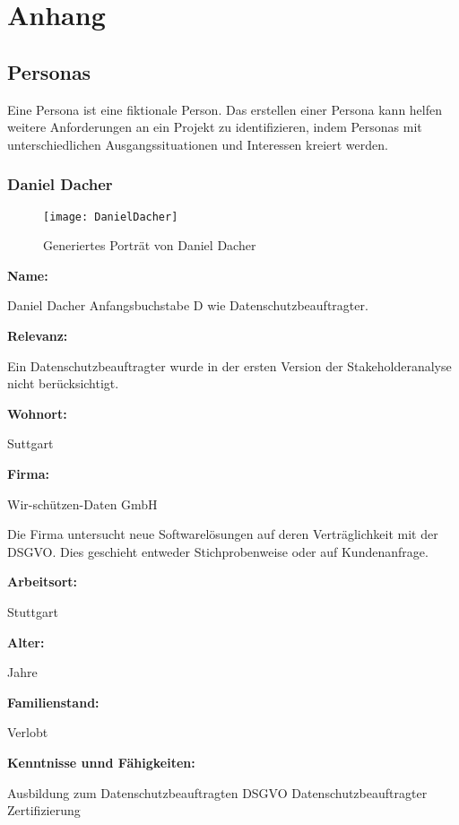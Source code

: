 \chapter{Anhang}
\label{ch:anhang}

\section{Personas}
\label{sec:personas}

Eine Persona ist eine fiktionale Person. Das erstellen einer Persona kann helfen weitere Anforderungen an ein Projekt zu identifizieren, indem Personas mit unterschiedlichen Ausgangssituationen und Interessen kreiert werden.

\pagebreak
\subsection{Daniel Dacher}
\label{subsec:danieldacher}

\begin{figure}[htpb]
    \centering
    \texttt{[image: DanielDacher]}
    \caption{Generiertes Porträt von Daniel Dacher \cite{misc:danieldacher}}
    \label{img:danieldacher}
\end{figure}
\textbf{Name:}
\par
\begingroup
\leftskip=30pt
\noindent
Daniel Dacher \newline
Anfangsbuchstabe D wie Datenschutzbeauftragter.
\par
\endgroup
\textbf{Relevanz:}
\par
\begingroup
\leftskip=30pt
\noindent
Ein Datenschutzbeauftragter wurde in der ersten Version der Stakeholderanalyse nicht berücksichtigt.
\par
\endgroup
\textbf{Wohnort:}
\par
\begingroup
\leftskip=30pt
\noindent
Suttgart
\par
\endgroup
\textbf{Firma:}
\par
\begingroup
\leftskip=30pt
\noindent
Wir-schützen-Daten GmbH

Die Firma untersucht neue Softwarelösungen auf deren Verträglichkeit mit der DSGVO. Dies geschieht entweder Stichprobenweise oder auf Kundenanfrage.
\par
\endgroup
\textbf{Arbeitsort:}
\par
\begingroup
\leftskip=30pt
\noindent
Stuttgart
\par
\endgroup
\textbf{Alter:}
\par
\begingroup
\leftskip=30pt
 Jahre
\par
\endgroup
\textbf{Familienstand:}
\par
\begingroup
\leftskip=30pt
\noindent
Verlobt
\par
\endgroup
\textbf{Kenntnisse unnd Fähigkeiten:}
\par
\begingroup
\leftskip=30pt
\noindent
Ausbildung zum Datenschutzbeauftragten \newline
DSGVO Datenschutzbeauftragter Zertifizierung
\par
\endgroup

